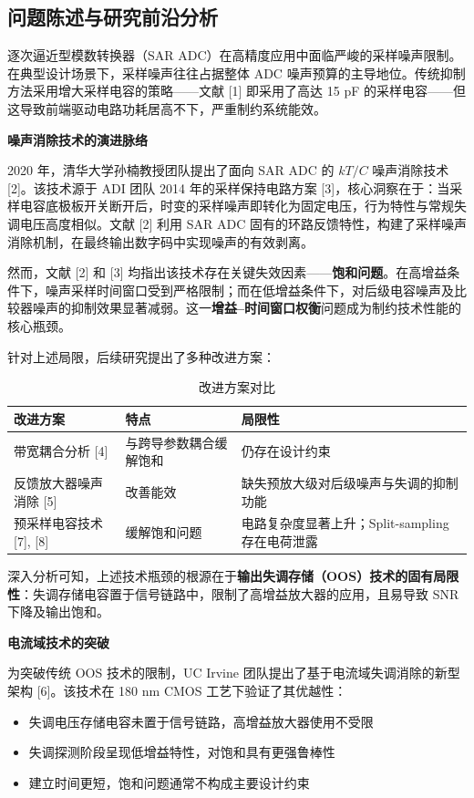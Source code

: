 \documentclass[11pt,a4paper,UTF8]{ctexart}
\begin{document}
\subsection{问题陈述与研究前沿分析}

逐次逼近型模数转换器（SAR ADC）在高精度应用中面临严峻的采样噪声限制。在典型设计场景下，采样噪声往往占据整体 ADC 噪声预算的主导地位。传统抑制方法采用增大采样电容的策略——文献 [1] 即采用了高达 15 pF 的采样电容——但这导致前端驱动电路功耗居高不下，严重制约系统能效。

\textbf{噪声消除技术的演进脉络}

2020 年，清华大学孙楠教授团队提出了面向 SAR ADC 的 $kT/C$ 噪声消除技术 [2]。该技术源于 ADI 团队 2014 年的采样保持电路方案 [3]，核心洞察在于：当采样电容底极板开关断开后，时变的采样噪声即转化为固定电压，行为特性与常规失调电压高度相似。文献 [2] 利用 SAR ADC 固有的环路反馈特性，构建了采样噪声消除机制，在最终输出数字码中实现噪声的有效剥离。

然而，文献 [2] 和 [3] 均指出该技术存在关键失效因素——\textbf{饱和问题}。在高增益条件下，噪声采样时间窗口受到严格限制；而在低增益条件下，对后级电容噪声及比较器噪声的抑制效果显著减弱。这一\textbf{增益--时间窗口权衡}问题成为制约技术性能的核心瓶颈。

针对上述局限，后续研究提出了多种改进方案：

\begin{table}[htbp]\centering\caption{改进方案对比}\label{tab:improve}\small
\begin{tabular}{lll}\toprule
\textbf{改进方案} & \textbf{特点} & \textbf{局限性} \\\midrule
带宽耦合分析 [4] & 与跨导参数耦合缓解饱和 & 仍存在设计约束 \\
反馈放大器噪声消除 [5] & 改善能效 & 缺失预放大级对后级噪声与失调的抑制功能 \\
预采样电容技术 [7], [8] & 缓解饱和问题 & 电路复杂度显著上升；Split-sampling 存在电荷泄露 \\\bottomrule
\end{tabular}
\end{table}

深入分析可知，上述技术瓶颈的根源在于\textbf{输出失调存储（OOS）技术的固有局限性}：失调存储电容置于信号链路中，限制了高增益放大器的应用，且易导致 SNR 下降及输出饱和。

\textbf{电流域技术的突破}

为突破传统 OOS 技术的限制，UC Irvine 团队提出了基于电流域失调消除的新型架构 [6]。该技术在 180 nm CMOS 工艺下验证了其优越性：
\begin{itemize}
  \item 失调电压存储电容未置于信号链路，高增益放大器使用不受限
  \item 失调探测阶段呈现低增益特性，对饱和具有更强鲁棒性
  \item 建立时间更短，饱和问题通常不构成主要设计约束
\end{itemize}
\end{document}
